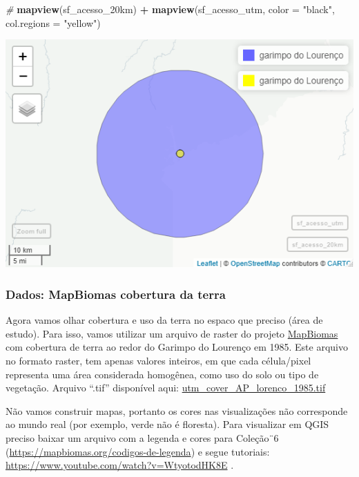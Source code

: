\documentclass[
]{article}
\newenvironment{Shaded}{\begin{snugshade}}{\end{snugshade}}
\newcommand{\AttributeTok}[1]{\textcolor[rgb]{0.13,0.29,0.53}{#1}}
\newcommand{\CommentTok}[1]{\textcolor[rgb]{0.56,0.35,0.01}{\textit{#1}}}
\newcommand{\FunctionTok}[1]{\textcolor[rgb]{0.13,0.29,0.53}{\textbf{#1}}}
\newcommand{\NormalTok}[1]{#1}
\newcommand{\SpecialCharTok}[1]{\textcolor[rgb]{0.81,0.36,0.00}{\textbf{#1}}}
\newcommand{\StringTok}[1]{\textcolor[rgb]{0.31,0.60,0.02}{#1}}
\begin{document}
\begin{Shaded}
\begin{Highlighting}[]
\CommentTok{\# }
\FunctionTok{mapview}\NormalTok{(sf\_acesso\_20km) }\SpecialCharTok{+} 
  \FunctionTok{mapview}\NormalTok{(sf\_acesso\_utm, }\AttributeTok{color =} \StringTok{"black"}\NormalTok{, }\AttributeTok{col.regions =} \StringTok{"yellow"}\NormalTok{)}
\end{Highlighting}
\end{Shaded}

\includegraphics[width=0.8\linewidth,height=0.8\textheight]{figures/mapview_point_buffer}

\hypertarget{dados-mapbiomas-cobertura-da-terra}{%
\subsubsection{Dados: MapBiomas cobertura da terra}\label{dados-mapbiomas-cobertura-da-terra}}

Agora vamos olhar cobertura e uso da terra no espaco que preciso (área de estudo).
Para isso, vamos utilizar um arquivo de raster do projeto \href{https://mapbiomas.org/}{MapBiomas}
com cobertura de terra ao redor do Garimpo do Lourenço em 1985.
Este arquivo no formato raster, tem apenas valores inteiros, em que
cada célula/pixel representa uma área considerada homogênea,
como uso do solo ou tipo de vegetação.
Arquivo ``.tif'' disponível aqui: \href{https://github.com/darrennorris/Amapa-mine/blob/main/data/raster/Mapbiomas_cover_lourenco_utm/utm_cover_AP_lorenco_1985.tif}{utm\_cover\_AP\_lorenco\_1985.tif}

Não vamos construir mapas, portanto os cores nas visualizações
não corresponde ao mundo real (por exemplo, verde não é floresta).
Para visualizar em QGIS preciso baixar um arquivo com a legenda e cores
para Coleção¨6 (\url{https://mapbiomas.org/codigos-de-legenda}) e
segue tutoriais: \url{https://www.youtube.com/watch?v=WtyotodHK8E} .
\end{document}
